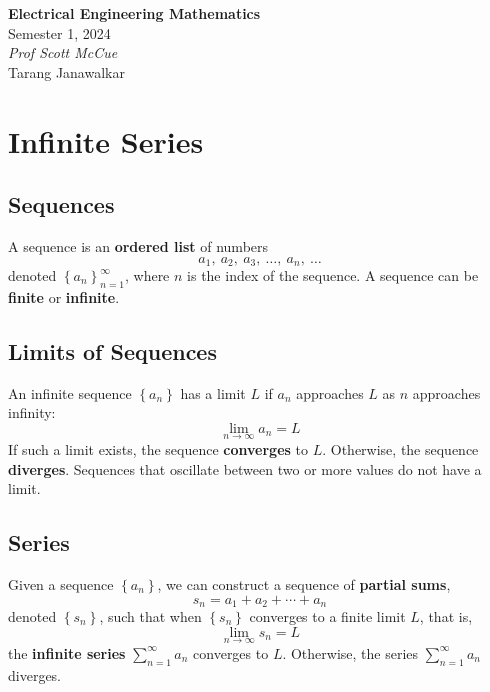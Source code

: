 \documentclass{article}
\date{}
\newcommand{\unitName}{Electrical Engineering Mathematics}
\newcommand{\unitTime}{Semester 1, 2024}
\newcommand{\unitCoordinator}{Prof Scott McCue}
\newcommand{\documentAuthors}{Tarang Janawalkar}
\begin{document}
%
\begin{titlepage}
    \vspace*{\fill}
    \begin{center}
        \LARGE{\textbf{\unitName}} \\[0.1in]
        \normalsize{\unitTime} \\[0.2in]
        \normalsize\textit{\unitCoordinator} \\[0.2in]
        \documentAuthors
    \end{center}
    \vspace*{\fill}
    \doclicenseThis
    \thispagestyle{empty}
\end{titlepage}
\newpage
%
\tableofcontents
\newpage
%
\section{Infinite Series}
\subsection{Sequences}
A sequence is an \textbf{ordered list} of numbers
\begin{equation*}
    a_1, \: a_2, \: a_3, \: \ldots, \: a_n, \: \ldots
\end{equation*}
denoted \({\left\{ a_n \right\}}_{n=1}^{\infty}\), where
\(n\) is the index of the sequence.
A sequence can be \textbf{finite} or \textbf{infinite}.
\subsection{Limits of Sequences}
An infinite sequence \(\left\{ a_n \right\}\) has a limit \(L\) if
\(a_n\) approaches \(L\) as \(n\) approaches infinity:
\begin{equation*}
    \lim_{n \to \infty} a_n = L
\end{equation*}
If such a limit exists, the sequence \textbf{converges} to \(L\).
Otherwise, the sequence \textbf{diverges}. Sequences that oscillate
between two or more values do not have a limit.
\subsection{Series}
Given a sequence \(\left\{ a_n \right\}\), we can construct a sequence
of \textbf{partial sums},
\begin{equation*}
    s_n = a_1 + a_2 + \cdots + a_n
\end{equation*}
denoted \(\left\{ s_n \right\}\), such that when \(\left\{ s_n \right\}\)
converges to a finite limit \(L\), that is,
\begin{equation*}
    \lim_{n \to \infty} s_n = L
\end{equation*}
the \textbf{infinite series} \(\sum_{n=1}^{\infty} a_n\) converges to \(L\).
Otherwise, the series \(\sum_{n=1}^{\infty} a_n\) diverges.
\end{document}
